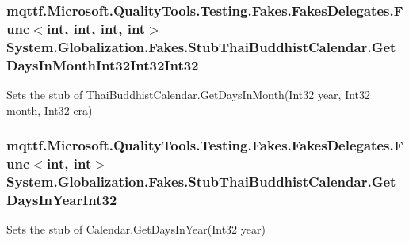 \hypertarget{class_system_1_1_globalization_1_1_fakes_1_1_stub_thai_buddhist_calendar_a06de4ed4a7f9992762c0f251964657f3}{
\subsubsection[{Get\-Days\-In\-Month\-Int32\-Int32\-Int32}]{\setlength{\rightskip}{0pt plus 5cm}mqttf.\-Microsoft.\-Quality\-Tools.\-Testing.\-Fakes.\-Fakes\-Delegates.\-Func$<$int, int, int, int$>$ System.\-Globalization.\-Fakes.\-Stub\-Thai\-Buddhist\-Calendar.\-Get\-Days\-In\-Month\-Int32\-Int32\-Int32}}\label{class_system_1_1_globalization_1_1_fakes_1_1_stub_thai_buddhist_calendar_a06de4ed4a7f9992762c0f251964657f3}


Sets the stub of Thai\-Buddhist\-Calendar.\-Get\-Days\-In\-Month(\-Int32 year, Int32 month, Int32 era)

\hypertarget{class_system_1_1_globalization_1_1_fakes_1_1_stub_thai_buddhist_calendar_ad4f81e51eeda04ca2c4796e619d77c5b}{
\subsubsection[{Get\-Days\-In\-Year\-Int32}]{\setlength{\rightskip}{0pt plus 5cm}mqttf.\-Microsoft.\-Quality\-Tools.\-Testing.\-Fakes.\-Fakes\-Delegates.\-Func$<$int, int$>$ System.\-Globalization.\-Fakes.\-Stub\-Thai\-Buddhist\-Calendar.\-Get\-Days\-In\-Year\-Int32}}\label{class_system_1_1_globalization_1_1_fakes_1_1_stub_thai_buddhist_calendar_ad4f81e51eeda04ca2c4796e619d77c5b}


Sets the stub of Calendar.\-Get\-Days\-In\-Year(\-Int32 year)

